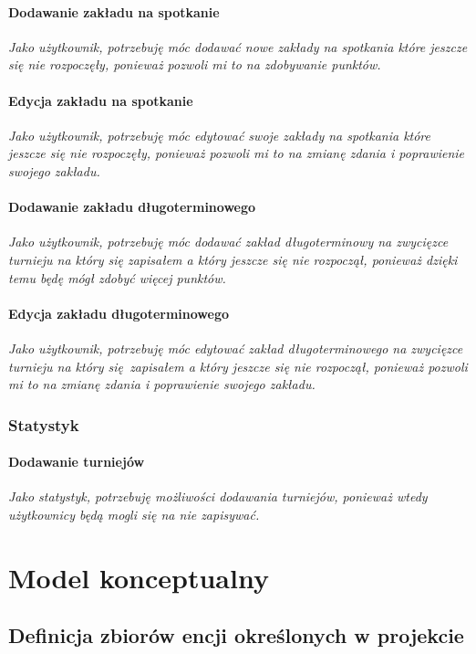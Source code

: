 \documentclass{mwrep}[15pt]
\begin{document}
\subsubsection{Dodawanie zakładu na spotkanie}
\emph{Jako użytkownik, potrzebuję móc dodawać nowe zakłady na spotkania które jeszcze się nie rozpoczęły, ponieważ pozwoli mi to na zdobywanie punktów.}

\subsubsection{Edycja zakładu na spotkanie}
\emph{Jako użytkownik, potrzebuję móc edytować swoje zakłady na spotkania które jeszcze się nie rozpoczęły, ponieważ pozwoli mi to na zmianę zdania i poprawienie swojego zakładu.}

\subsubsection{Dodawanie zakładu długoterminowego}
\emph{Jako użytkownik, potrzebuję móc dodawać zakład długoterminowy na zwycięzce turnieju na który się zapisałem a który jeszcze się nie rozpoczął, ponieważ dzięki temu będę mógł zdobyć więcej punktów.}

\subsubsection{Edycja zakładu długoterminowego}
\emph{Jako użytkownik, potrzebuję móc edytować zakład długoterminowego na zwycięzce turnieju na który się zapisałem a który jeszcze się nie rozpoczął, ponieważ pozwoli mi to na zmianę zdania i poprawienie swojego zakładu.}

\subsection{Statystyk}
\subsubsection{Dodawanie turniejów}
\emph{Jako statystyk, potrzebuję możliwości dodawania turniejów, ponieważ wtedy użytkownicy będą mogli się na nie zapisywać.}


\chapter{Model konceptualny}

\section{Definicja zbiorów encji określonych w projekcie}
\end{document}
